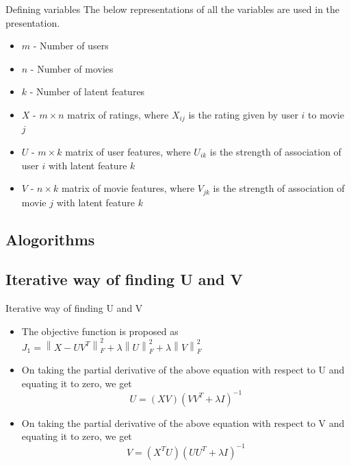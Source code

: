 \documentclass{beamer}
\newcommand\norm[1]{\left\lVert#1\right\rVert}
\begin{document}
\begin{frame}{Defining variables}
The below representations of all the variables are used in the presentation.
\begin{itemize}
    \item $m$ - Number of users
    \item $n$ - Number of movies
    \item $k$ - Number of latent features
    \item $X$ - $m \times n$ matrix of ratings, where $X_{ij}$ is the rating given by user $i$ to movie $j$
    \item $U$ - $m \times k$ matrix of user features, where $U_{ik}$ is the strength of association of user $i$ with latent feature $k$
    \item $V$ - $n \times k$ matrix of movie features, where $V_{jk}$ is the strength of association of movie $j$ with latent feature $k$
\end{itemize}
\end{frame}

\begin{frame}
\section{Alogorithms}
\end{frame}

\begin{frame}
\section{Iterative way of finding U and V}
\end{frame}

\begin{frame}{Iterative way of finding U and V}
    \begin{itemize}
        \item The objective function is proposed as $J_1 = \norm{X - UV^T}_F^2 + \lambda\norm{U}_F^2 + \lambda\norm{V}_F^2$
        \item On taking the partial derivative of the above equation with respect to U and equating it to zero, we get $$U = (XV)(VV^T + \lambda I)^{-1}$$
        \item On taking the partial derivative of the above equation with respect to V and equating it to zero, we get $$V = (X^TU)(UU^T + \lambda I)^{-1}$$
    \end{itemize}


\end{frame}
\end{document}
